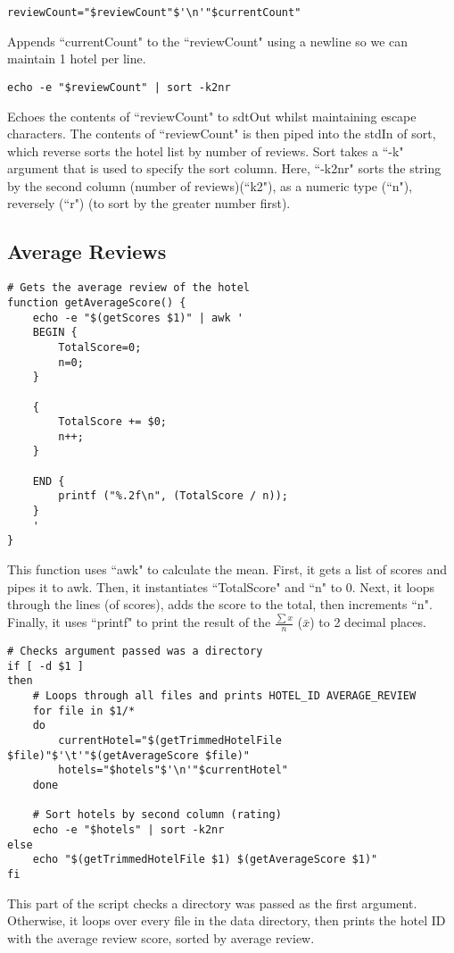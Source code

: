 \documentclass[a4paper]{article}
\begin{document}
\begin{lstlisting}
reviewCount="$reviewCount"$'\n'"$currentCount"
\end{lstlisting}
Appends ``currentCount" to the ``reviewCount" using a newline so we can maintain 1 hotel per line.

\begin{lstlisting}
echo -e "$reviewCount" | sort -k2nr
\end{lstlisting}
Echoes the contents of ``reviewCount" to sdtOut whilst maintaining escape characters.
The contents of ``reviewCount" is then piped into the stdIn of sort, which reverse sorts the hotel list by number of reviews.
Sort takes a ``-k" argument that is used to specify the sort column.
Here, ``-k2nr" sorts the string by the second column (number of reviews)(``k2"), as a numeric type (``n"), reversely (``r") (to sort by the greater number first).

%
\newpage
\subsection{Average Reviews}
\begin{lstlisting}
# Gets the average review of the hotel
function getAverageScore() {
	echo -e "$(getScores $1)" | awk '
	BEGIN {
		TotalScore=0;
		n=0;
	}

	{
		TotalScore += $0;
		n++;
	}

	END {
		printf ("%.2f\n", (TotalScore / n));
	}
	'
}
\end{lstlisting}
This function uses ``awk" to calculate the mean.
First, it gets a list of scores and pipes it to awk.
Then, it instantiates ``TotalScore" and ``n" to 0.
Next, it loops through the lines (of scores), adds the score to the total, then increments ``n".
Finally, it uses ``printf" to print the result of the $\frac{\sum{x}}{n}$ ($\bar{x}$) to 2 decimal places.


\begin{lstlisting}
# Checks argument passed was a directory
if [ -d $1 ]
then
	# Loops through all files and prints HOTEL_ID AVERAGE_REVIEW
	for file in $1/*
	do
		currentHotel="$(getTrimmedHotelFile $file)"$'\t'"$(getAverageScore $file)"
		hotels="$hotels"$'\n'"$currentHotel"
	done
	
	# Sort hotels by second column (rating)
	echo -e "$hotels" | sort -k2nr
else
	echo "$(getTrimmedHotelFile $1) $(getAverageScore $1)"
fi
\end{lstlisting}
This part of the script checks a directory was passed as the first argument.
Otherwise, it loops over every file in the data directory, then prints the hotel ID with the average review score, sorted by average review.
\end{document}

